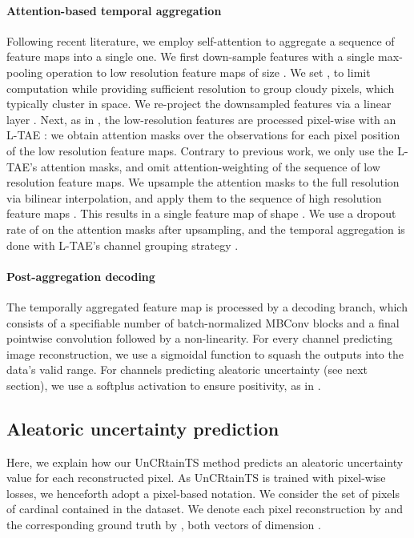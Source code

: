\documentclass[10pt,twocolumn,letterpaper]{article}
\begin{document}
\paragraph{\bf Attention-based temporal aggregation } Following recent literature, we employ self-attention to aggregate a sequence of feature maps  into a single one. We first down-sample features  with a single max-pooling operation to low resolution feature maps  of size . We set , to limit computation while providing sufficient resolution to group cloudy pixels, which typically cluster in space.  We re-project the downsampled features via a linear layer .
Next, as in \cite{garnot2021panoptic}, the low-resolution features  are processed pixel-wise with an L-TAE \cite{garnot2020lightweight,garnot2020satellite}: we obtain attention masks over the  observations  for each pixel position of the low resolution feature maps. Contrary to previous work, we only use the L-TAE's  attention masks, and omit attention-weighting of the sequence of low resolution feature maps. We upsample the attention masks to the full resolution via bilinear interpolation, and apply them to the sequence of high resolution feature maps . This results in a single feature map  of shape .
We use a dropout rate of  on the attention masks after upsampling, and the temporal aggregation is done with L-TAE's channel grouping strategy \cite{garnot2020lightweight}. 

\paragraph{\bf Post-aggregation decoding} The temporally aggregated feature map  is processed by a decoding branch, which consists of a specifiable number  of batch-normalized MBConv blocks and a final  pointwise convolution followed by a non-linearity. 
For every channel predicting image reconstruction, we use a sigmoidal function to  squash the outputs into the data's valid range.
For channels predicting aleatoric uncertainty (see next section), we use a softplus activation to ensure positivity, as in \cite{seitzer2021pitfalls, harakeh2022estimating, stirn2022faithful}.


\subsection{Aleatoric uncertainty prediction}
\label{sub:optimization}

Here, we explain how our UnCRtainTS method predicts an aleatoric uncertainty value for each reconstructed pixel. As UnCRtainTS is trained with pixel-wise losses, we henceforth adopt a pixel-based notation. We consider the set of pixels of cardinal  contained in the dataset. We denote each pixel reconstruction by  and the corresponding ground truth by , both vectors of dimension . 
\end{document}

